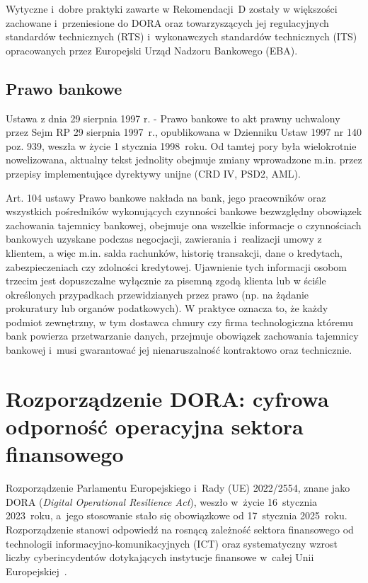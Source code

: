 Wytyczne i~dobre praktyki zawarte w Rekomendacji~D zostały w większości zachowane i~przeniesione do DORA oraz towarzyszących jej regulacyjnych
standardów technicznych (RTS) i~wykonawczych standardów technicznych (ITS) opracowanych przez Europejski Urząd Nadzoru Bankowego (EBA).

\subsection{Prawo bankowe}
Ustawa z dnia 29 sierpnia 1997 r. - {Prawo bankowe} to akt prawny uchwalony przez Sejm RP 29 sierpnia 1997~r., opublikowana w Dzienniku Ustaw 1997 nr 140 poz. 939, weszła w życie 1 stycznia 1998~roku. Od tamtej pory była wielokrotnie nowelizowana, aktualny tekst jednolity obejmuje zmiany wprowadzone m.in. przez przepisy implementujące dyrektywy unijne (CRD IV, PSD2, AML).

Art. 104 ustawy Prawo bankowe nakłada na bank, jego pracowników oraz wszystkich pośredników wykonujących czynności bankowe bezwzględny obowiązek zachowania tajemnicy bankowej, obejmuje ona wszelkie informacje o czynnościach bankowych uzyskane podczas negocjacji, zawierania i~realizacji umowy z klientem, a więc m.in. salda rachunków, historię transakcji, dane o kredytach, zabezpieczeniach czy zdolności kredytowej. Ujawnienie tych informacji osobom trzecim jest dopuszczalne wyłącznie za pisemną zgodą klienta lub w ściśle określonych przypadkach przewidzianych przez prawo (np. na żądanie prokuratury lub organów podatkowych). W praktyce oznacza to, że każdy podmiot zewnętrzny, w tym dostawca chmury czy firma technologiczna któremu bank powierza przetwarzanie danych, przejmuje obowiązek zachowania tajemnicy bankowej i~musi gwarantować jej nienaruszalność kontraktowo oraz technicznie.

\section{Rozporządzenie DORA: cyfrowa odporność operacyjna sektora finansowego}

Rozporządzenie Parlamentu Europejskiego i~Rady (UE) 2022/2554, znane jako {DORA} (\textit{Digital Operational Resilience Act}), weszło w~życie 16~stycznia 2023~roku, a~jego stosowanie stało się obowiązkowe od 17~stycznia 2025~roku.
Rozporządzenie stanowi odpowiedź na rosnącą zależność sektora finansowego od technologii informacyjno-komunikacyjnych (ICT) oraz systematyczny wzrost liczby cyberincydentów dotykających instytucje finansowe w~całej Unii Europejskiej~\autocite{dora2022}.

